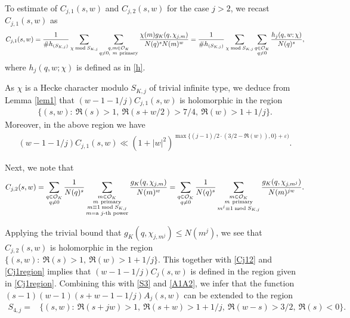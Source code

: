 \documentclass[twoside,leqno,10pt, A4]{amsart}
\begin{document}
To estimate of $C_{j,1}(s,w)$ and $C_{j,2}(s,w)$ for the case $j > 2$, we recast $C_{j,1}(s,w)$ as
\begin{align*}
\begin{split}
		C_{j,1}(s,w)=\frac {1}{\#h_{(S_{K,j})}}\sum_{\chi \bmod {S_{K,j}}} \sum_{\substack{q, m \in \mathcal O_K \\ q\neq 0, \ m \mathrm{\ primary}
}}\frac{\chi(m)g_K(q, \chi_{j,m})}{N(q)^sN(m)^w}=\frac {1}{\#h_{(S_{K,j})}}\sum_{\chi \bmod {S_{K,j}}} \sum_{\substack{q \in \mathcal O_K \\ q\neq 0
}}\frac{h_j(q,w;\chi)}{N(q)^s},
\end{split}
\end{align*}	
 where $h_j(q,w;\chi)$ is defined as in \eqref{h}. \newline

As $\chi$ is a Hecke character modulo $S_{K,j}$ of trivial infinite type, we deduce from Lemma \ref{lem1} that $(w-1-1/j)C_{j,1}(s,w)$ is holomorphic in the region
\begin{align}
\label{Cj1region}
		\{(s,w):\ \Re(s)>1, \ \Re(s+ w/2)> 7/4, \ \Re(w)>1+ 1/j \}.
\end{align}
  Moreover, in the above region we have
\begin{align}
\label{Cj1bound}
		(w-1-1/j)C_{j,1}(s,w) \ll (1+|w|^2)^{ \max \{ (j-1)/2 \cdot (3/2-\Re(w)), 0\}+\varepsilon)}.
\end{align}

   Next, we note that
\begin{align*}
  C_{j,2}(s,w)= \sum_{\substack{q \in \mathcal O_K \\ q\neq 0}}\frac{1}{N(q)^s} \sum_{\substack{ m \in \mathcal O_K \\ m \mathrm{\ primary} \\ m \equiv 1
\bmod {S_{K,j}}\\ m =  \text{a $j$-th power}}}\frac{g_K(q,\chi_{j,m})}{N(m)^w} =  \sum_{\substack{q \in \mathcal O_K \\ q\neq 0}}\frac{1}{N(q)^s} \sum_{\substack{ m \in \mathcal O_K \\ m \mathrm{\ primary} \\ m^j \equiv 1  \bmod
{S_{K,j}} }}\frac{g_K(q, \chi_{j,m^j})}{N(m)^{jw}}.
\end{align*}

  Applying the trivial bound that $g_K(q, \chi_{j,m^j})\leq N(m^j)$, we see that $C_{j,2}(s,w)$ is holomorphic in the region $\{ (s, w): \
\Re(s)>1,\ \Re(w)>1+1/j \}$. This together with \eqref{Cj12} and \eqref{Cj1region} implies that $(w-1-1/j)C_j(s,w)$ is defined in the region
given in \eqref{Cj1region}. Combining this with \eqref{S3} and \eqref{A1A2}, we infer that the function $(s-1)(w-1)(s+w-1-1/j)A_j(s,w)$ can be extended to
the region
\begin{align*}
		S_{4,j}=& \{(s,w): \ \Re(s+jw)>1, \ \Re(s+w)>1+1/j, \ \Re(w-s)> 3/2, \ \Re(s)<0 \}.
\end{align*}
\end{document}
